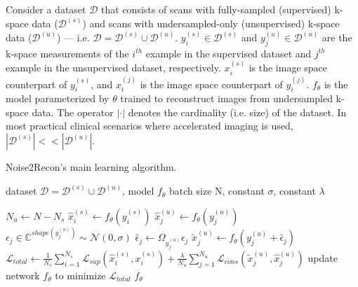\documentclass[10pt,twocolumn,letterpaper]{article}
\begin{document}
Consider a dataset $\mathcal{D}$ that consists of scans with fully-sampled (supervised) k-space data ($\mathcal{D}^{(s)}$) and scans with undersampled-only (unsupervised) k-space data ($\mathcal{D}^{(u)}$) --- i.e. $\mathcal{D} = \mathcal{D}^{(s)} \cup \mathcal{D}^{(u)}$. $y^{(s)}_i \in \mathcal{D}^{(s)}$ and $y^{(u)}_j \in \mathcal{D}^{(u)}$ are the k-space measurements of the $i^{th}$ example in the supervised dataset and $j^{th}$ example in the unsupervised dataset, respectively. $x^{(s)}_i$ is the image space counterpart of $y^{(s)}_i$, and $x^{(j)}_i$ is the image space counterpart of $y^{(j)}_i$. $f_{\theta}$ is the model parameterized by $\theta$ trained to reconstruct images from undersampled k-space data. The operator $|\cdot|$ denotes the cardinality (i.e. size) of the dataset. In most practical clinical scenarios where accelerated imaging is used, $|\mathcal{D}^{(s)}| << |\mathcal{D}^{(u)}|$.

\begin{algorithm}[t!]
 \caption{Noise2Recon's main learning algorithm.}
 \label{alg:n2r-method}
 \begin{algorithmic}[1]
 \REQUIRE dataset $\mathcal{D}=\mathcal{D}^{(s)}\cup\mathcal{D}^{(u)}$, model $f_\theta$
 \REQUIRE batch size N, constant $\sigma$, constant $\lambda$
 
    \STATE $N_u \gets N - N_s$ 
        \STATE $\hat{x}^{(s)}_i \gets f_\theta(y_i^{(s)})$
    \ENDFOR
        \STATE $\hat{x}^{(u)}_j \gets f_\theta(y_j^{(u)})$
        \STATE $\epsilon_j \in \mathbb{C}^{shape(y_j^{(u)})} \sim \mathcal{N}(0, \sigma)$
        \STATE $\tilde{\epsilon_j} \gets \Omega_{y_j^{(u)}} \epsilon_j$
        \STATE $\tilde{x}^{(u)}_j \gets f_\theta(y_j^{(u)} + \tilde{\epsilon_j})$
    \ENDFOR
    \STATE $\mathcal{L}_{total} \gets \frac{1}{N_s} \sum_{i=1}^{N_s}\mathcal{L}_{sup}(\hat{x}^{(s)}_i, x^{(s)}_i) + \frac{\lambda}{N_u}\sum_{j=1}^{N_u}\mathcal{L}_{cons}(\tilde{x}^{(u)}_j, \hat{x}^{(u)}_j)$
    \STATE update network $f_\theta$ to minimize $\mathcal{L}_{total}$
 \ENDFOR
 \RETURN{} $f_\theta$
\end{algorithmic} 
\end{algorithm}
\end{document}

